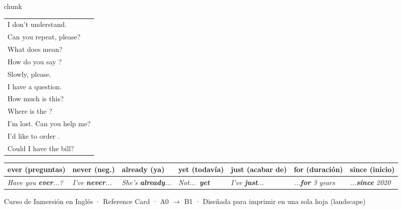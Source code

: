 \documentclass[10pt,a4paper,landscape]{article}
\begin{document}
\begin{multicols}{3}
\begin{cajaseccion}{chunk}
{\scriptsize
\begin{tabularx}{\linewidth}{@{} X @{}}
\toprule
I don't understand. \\
Can you repeat, please? \\
What does \underline{\hspace{0.8cm}} mean? \\
How do you say \underline{\hspace{0.8cm}}? \\
Slowly, please. \\
I have a question. \\
How much is this? \\
Where is the \underline{\hspace{0.8cm}}? \\
I'm lost. Can you help me? \\
I'd like to order \underline{\hspace{0.8cm}}. \\
Could I have the bill? \\
\bottomrule
\end{tabularx}
}
\end{cajaseccion}

\end{multicols}

\vspace{0.2cm}

\begin{center}
{\scriptsize
\begin{tabularx}{0.95\textwidth}{@{} *{7}{X} @{}}
\toprule
\textbf{ever} (preguntas) & \textbf{never} (neg.) & \textbf{already} (ya) & \textbf{yet} (todavía) & \textbf{just} (acabar de) & \textbf{for} (duración) & \textbf{since} (inicio) \\
\midrule
\textit{Have you \textbf{ever}...?} & \textit{I've \textbf{never}...} & \textit{She's \textbf{already}...} & \textit{Not...~\textbf{yet}} & \textit{I've \textbf{just}...} & \textit{...\textbf{for} 3 years} & \textit{...\textbf{since} 2020} \\
\bottomrule
\end{tabularx}
}
\end{center}

\vfill
\begin{center}
{\tiny\color{grissuave} Curso de Inmersión en Inglés · Reference Card · A0 $\rightarrow$ B1 · Diseñada para imprimir en una sola hoja (landscape)}
\end{center}
\end{document}
